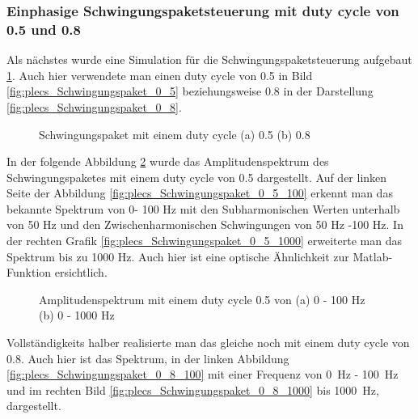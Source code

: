 \subsubsection{Einphasige Schwingungspaketsteuerung mit duty cycle von 0.5 und 0.8}

Als nächstes wurde eine Simulation für die Schwingungspaketsteuerung aufgebaut \ref{fig:plecs_Schwingungspakete}. Auch hier verwendete man einen duty cycle von 0.5 in Bild  \ref{fig:plecs_Schwingungspaket_0_5} beziehungsweise 0.8 in der Darstellung \ref{fig:plecs_Schwingungspaket_0_8}.  
\begin{figure}[ht!]
	\centering
	\qquad
	\caption{Schwingungspaket mit einem duty cycle (a) 0.5 (b) 0.8}
	\label{fig:plecs_Schwingungspakete}
\end{figure}

In der folgende Abbildung \ref{fig:plecs_Schwingungspakete_Amplitudenspektrum_ 0_5_100_1000} wurde das Amplitudenspektrum des Schwingungspaketes mit einem duty cycle von 0.5 dargestellt. Auf der linken Seite der Abbildung \ref{fig:plecs_Schwingungspaket_0_5_100} erkennt man das bekannte Spektrum von 0- 100 Hz mit den Subharmonischen Werten unterhalb von 50 Hz und den Zwischenharmonischen Schwingungen von 50 Hz -100 Hz. In der rechten Grafik  \ref{fig:plecs_Schwingungspaket_0_5_1000} erweiterte man das Spektrum bis zu 1000 Hz. Auch hier ist eine optische Ähnlichkeit zur  Matlab-Funktion ersichtlich.     
\begin{figure}[ht!]
	\centering
	\qquad
	\caption{Amplitudenspektrum mit einem duty cycle 0.5 von (a) 0 - 100 Hz (b) 0 - 1000 Hz}
	\label{fig:plecs_Schwingungspakete_Amplitudenspektrum_ 0_5_100_1000}
\end{figure}


Vollständigkeits halber realisierte man das gleiche noch mit einem duty cycle von 0.8. Auch hier ist das Spektrum, in der linken Abbildung \ref{fig:plecs_Schwingungspaket_0_8_100} mit einer Frequenz von \SI{0}{Hz} - \SI{100}{Hz} und im rechten Bild \ref{fig:plecs_Schwingungspaket_0_8_1000} bis \SI{1000}{Hz}, dargestellt. 


